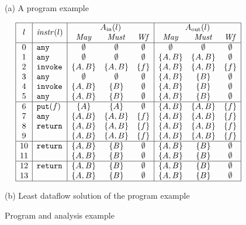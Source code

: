 \documentclass{entcs}
\newcommand{\may}{\ensuremath{\mathit{May}}}
\newcommand{\must}{\ensuremath{\mathit{Must}}}
\newcommand{\wf}{\ensuremath{\mathit{Wf}}}
\begin{document}
\begin{figure}
  \centering
  \begin{minipage}[b]{6.8cm}
    \begin{center} \footnotesize
      (a) A program example
    \end{center}
  \end{minipage}
  \begin{minipage}[b]{6.7cm}\tiny
    $$
    \begin{array}[t]{|c|l|ccc|ccc|}\hline
      \multirow{2}{*}{$l$} & \multirow{2}{*}{$\instrAt(l)$} & \multicolumn{3}{c|}{A_\inA(l)} & \multicolumn{3}{c|}{A_\outA(l)} \\
      & & \may & \must & \wf & \may & \must & \wf \\\hline
      0 & \any    & \emptyset & \emptyset& \emptyset& \emptyset & \emptyset & \emptyset \\
      1 & \any    & \emptyset & \emptyset & \emptyset & \{A,B\} & \{A,B\} & \emptyset\\
      2 & \invoke & \{A,B\} & \{A,B\} & \{f\} & \{A,B\} & \{A,B\} & \{f\}\\
      3 & \any    & \emptyset & \emptyset & \emptyset & \{A,B\} & \{B\} & \emptyset\\
      4 & \invoke & \{A,B\} & \{B\} & \emptyset & \{A,B\} & \{B\} & \emptyset\\
      5 & \any    & \{A,B\} & \{B\} & \emptyset & \{A,B\} & \{B\} & \emptyset\\\hline
      6 & \putS(f)& \{A\} & \{A\} & \emptyset & \{A,B\} & \{A,B\} & \{f\}\\
      7 & \any    & \{A,B\} & \{A,B\} &\{f\}& \{A,B\} & \{A,B\} & \{f\}\\
      8 & \return & \{A,B\} & \{A,B\} &\{f\}& \{A,B\} & \{A,B\} & \{f\}\\
      9 &         & \{A,B\} & \{A,B\} & \{f\}& \{A,B\} & \{A,B\}& \{f\} \\\hline
      10& \return & \{A,B\} & \{B\} & \emptyset & \{A,B\} & \{B\} & \emptyset \\
      11&         & \{A,B\} & \{B\} & \emptyset & \{A,B\} & \{B\} & \emptyset\\\hline
      12& \return & \{A,B\} & \{B\}& \emptyset& \{A,B\} & \{B\} & \emptyset\\
      13&         & \{A,B\} & \{B\}& \emptyset& \{A,B\} & \{B\} & \emptyset\\\hline
    \end{array}
    $$
    \begin{center} \footnotesize
      (b) Least dataflow solution of the program example
    \end{center}
  \end{minipage}
  \caption{Program and analysis example}
  \label{fig:example}
\end{figure}
\end{document}
